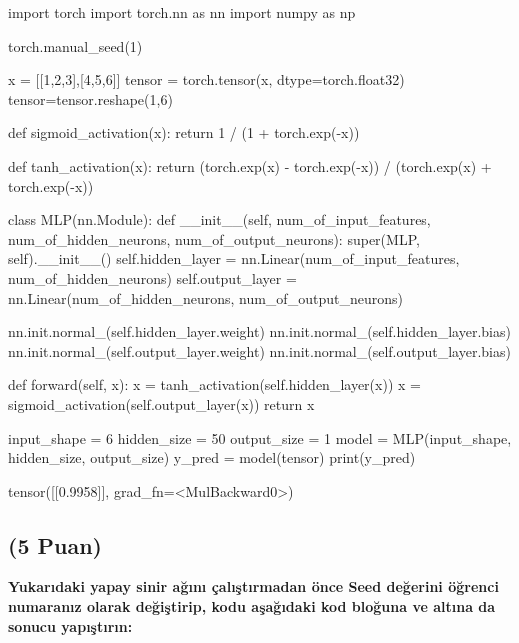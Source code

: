 \documentclass[11pt]{article}
\begin{document}
\begin{python}
import torch
import torch.nn as nn
import numpy as np

torch.manual_seed(1)

x = [[1,2,3],[4,5,6]]
tensor = torch.tensor(x, dtype=torch.float32)
tensor=tensor.reshape(1,6)

def sigmoid_activation(x):
  return 1 / (1 + torch.exp(-x))

def tanh_activation(x):
    return (torch.exp(x) - torch.exp(-x)) / (torch.exp(x) + torch.exp(-x)) 

class MLP(nn.Module):
    def __init__(self, num_of_input_features, num_of_hidden_neurons, num_of_output_neurons):
        super(MLP, self).__init__()
        self.hidden_layer = nn.Linear(num_of_input_features, num_of_hidden_neurons)
        self.output_layer = nn.Linear(num_of_hidden_neurons, num_of_output_neurons)

        nn.init.normal_(self.hidden_layer.weight)
        nn.init.normal_(self.hidden_layer.bias)
        nn.init.normal_(self.output_layer.weight)
        nn.init.normal_(self.output_layer.bias)

    def forward(self, x):
        x = tanh_activation(self.hidden_layer(x))
        x = sigmoid_activation(self.output_layer(x))
        return x

input_shape = 6
hidden_size = 50
output_size = 1
model = MLP(input_shape, hidden_size, output_size)
y_pred = model(tensor)
print(y_pred)
\end{python}

{tensor([[0.9958]], grad_fn=<MulBackward0>)}

\subsection{(5 Puan)} \textbf{Yukarıdaki yapay sinir ağını çalıştırmadan önce Seed değerini öğrenci numaranız olarak değiştirip, kodu aşağıdaki kod bloğuna ve altına da sonucu yapıştırın:}
\end{document}
